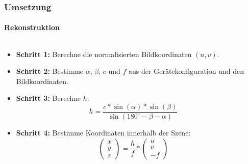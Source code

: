 \documentclass[xcolor=dvipsnames]{beamer}
\begin{document}
\begin{frame}
	\frametitle{Umsetzung}
	\framesubtitle{Rekonstruktion}

	\begin{columns}
		\small
		\begin{column}{.61\linewidth}
			\begin{itemize}
				\item \textbf{Schritt 1:} Berechne die normalisierten Bildkoordinaten $(u,v)$.
				\item \textbf{Schritt 2:} Bestimme $\alpha$, $\beta$, $c$ und $f$ aus der Gerätekonfiguration und den Bildkoordinaten.
				\item \textbf{Schritt 3:} Berechne $h$:
				\[h = \frac{c * \sin(\alpha) * \sin(\beta)}{\sin(180^\circ - \beta - \alpha)}\]
				\item \textbf{Schritt 4:} Bestimme Koordinaten innerhalb der Szene:
				\[\begin{pmatrix}x\\y\\z\end{pmatrix} = \frac{h}{f} *
				\begin{pmatrix}u\\v\\-f\end{pmatrix}\]
			\end{itemize}
		\end{column}
		\begin{column}{.39\linewidth}
			\hfill{}

\end{column}
\end{columns}
\end{frame}
\end{document}
